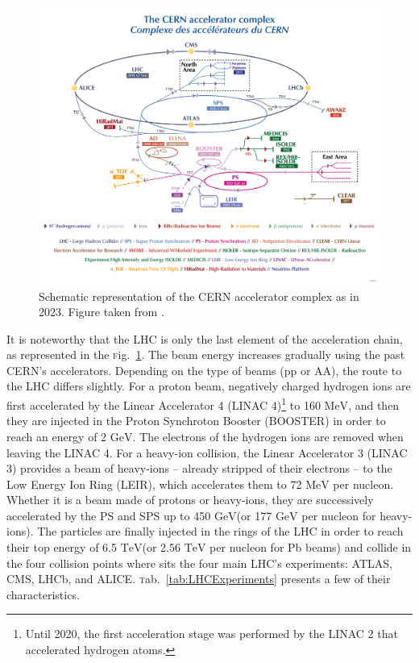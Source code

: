 \documentclass[ALICE,manyauthors]{cernphprep}
\newcommand{\Fig}       {\textsc{f}ig.~}
\newcommand{\fig}       {\Fig}
\newcommand{\Tab}       {\textsc{t}ab.~}
\newcommand {\unitStyle}[1] {\mbox{\ensuremath{\text{#1}}}}
\newcommand {\tev}      {\unitStyle{TeV}\xspace}
\newcommand {\gev}      {\unitStyle{GeV}\xspace}
\newcommand {\mev}      {\unitStyle{MeV}\xspace}
\begin{document}
\begin{figure}[t]
	\centering
	\includegraphics[width=1\textwidth]{Figs/Chapter3/CCC-v2022_Large.png}
	\caption{Schematic representation of the CERN accelerator complex as in 2023. Figure taken from \cite{lopienskaewaCERNAcceleratorComplex2022}.}
	\label{fig:AcceleratorComplex}
\end{figure}

It is noteworthy that the LHC is only the last element of the acceleration chain, as represented in the \fig\ref{fig:AcceleratorComplex}. The beam energy increases gradually using the past CERN's accelerators. Depending on the type of beams (pp or AA), the route to the LHC differs slightly. For a proton beam, negatively charged hydrogen ions are first accelerated by the Linear Accelerator 4 (LINAC 4)\footnote{Until 2020, the first acceleration stage was performed by the LINAC 2 that accelerated hydrogen atoms.} to 160 \mev, and then they are injected in the Proton Synchroton Booster (BOOSTER) in order to reach an energy of 2 \gev. The electrons of the hydrogen ions are removed when leaving the LINAC 4. For a heavy-ion collision, the Linear Accelerator 3 (LINAC 3) provides a beam of heavy-ions -- already stripped of their electrons -- to the Low Energy Ion Ring (LEIR), which accelerates them to 72 \mev per nucleon. Whether it is a beam made of protons or heavy-ions, they are successively accelerated by the PS and SPS up to 450 \gev (or 177 \gev per nucleon for heavy-ions). The particles are finally injected in the rings of the LHC in order to reach their top energy of 6.5 \tev (or 2.56 \tev per nucleon for Pb beams) and collide in the four collision points where sits the four main LHC's experiments: ATLAS, CMS, LHCb, and ALICE\cite{AcceleratorComplexCERN}. \Tab\ref{tab:LHCExperiments} presents a few of their characteristics. 
\end{document}
